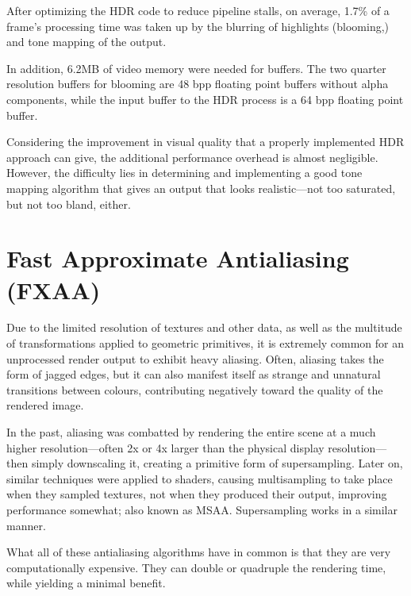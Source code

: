 \documentclass[11pt, oneside]{report}
\begin{document}
After optimizing the \gls{HDR} code to reduce \glspl{pipeline stall}, on average, 1.7\% of a frame's processing time was taken up by the blurring of highlights (blooming,) and \gls{tone mapping} of the output.

In addition, 6.2MB of video memory were needed for buffers. The two quarter resolution buffers for blooming are 48 \gls{bpp} floating point buffers without alpha components, while the input buffer to the HDR process is a 64 \gls{bpp} floating point buffer.

Considering the improvement in visual quality that a properly implemented \gls{HDR} approach can give, the additional performance overhead is almost negligible. However, the difficulty lies in determining and implementing a good \gls{tone mapping} algorithm that gives an output that looks realistic---not too saturated, but not too bland, either.



\chapter{Fast Approximate Antialiasing (FXAA)}
Due to the limited resolution of textures and other data, as well as the multitude of transformations applied to geometric primitives, it is extremely common for an unprocessed render output to exhibit heavy \gls{aliasing}. Often, \gls{aliasing} takes the form of jagged edges, but it can also manifest itself as strange and unnatural transitions between colours, contributing negatively toward the quality of the rendered image.

In the past, aliasing was combatted by rendering the entire scene at a much higher resolution---often 2x or 4x larger than the physical display resolution---then simply downscaling it, creating a primitive form of \gls{supersampling}. Later on, similar techniques were applied to \glspl{shader}, causing \gls{multisampling} to take place when they sampled textures, not when they produced their output, improving performance somewhat; also known as MSAA. Supersampling works in a similar manner.

What all of these antialiasing algorithms have in common is that they are very computationally expensive. They can double or quadruple the rendering time, while yielding a minimal benefit.
\end{document}
